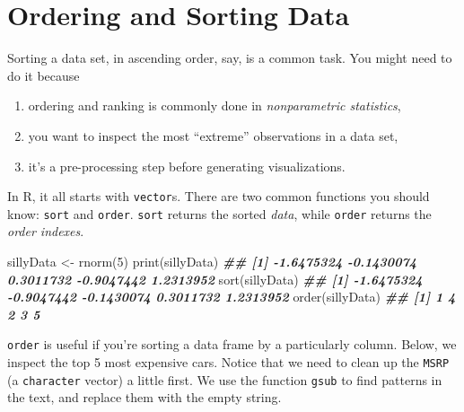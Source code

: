 \documentclass[
  12pt,
]{krantz}
\makeatletter
\newenvironment{Shaded}{\begin{snugshade}}{\end{snugshade}}
\newcommand{\DecValTok}[1]{\textcolor[rgb]{0.06,0.06,0.06}{#1}}
\newcommand{\DocumentationTok}[1]{\textcolor[rgb]{0.37,0.37,0.37}{\textbf{\textit{#1}}}}
\newcommand{\FunctionTok}[1]{\textcolor[rgb]{0,0,0}{#1}}
\newcommand{\NormalTok}[1]{#1}
\newcommand{\OtherTok}[1]{\textcolor[rgb]{0.37,0.37,0.37}{#1}}
\providecommand{\tightlist}{%
  \setlength{\itemsep}{0pt}\setlength{\parskip}{0pt}}
\newenvironment{kframe}{%
\medskip{}
\setlength{\fboxsep}{.8em}
 \def\at@end@of@kframe{}%
 \ifinner\ifhmode%
  \def\at@end@of@kframe{\end{minipage}}%
  \begin{minipage}{\columnwidth}%
 \fi\fi%
 \def\FrameCommand##1{\hskip\@totalleftmargin \hskip-\fboxsep
 \colorbox{shadecolor}{##1}\hskip-\fboxsep
     \hskip-\linewidth \hskip-\@totalleftmargin \hskip\columnwidth}%
 \MakeFramed {\advance\hsize-\width
   \@totalleftmargin\z@ \linewidth\hsize
   \@setminipage}}%
 {\par\unskip\endMakeFramed%
 \at@end@of@kframe}
\renewenvironment{Shaded}{\begin{kframe}}{\end{kframe}}
\makeatother
\begin{document}
\hypertarget{ordering-and-sorting-data}{%
\section{Ordering and Sorting Data}\label{ordering-and-sorting-data}}

Sorting a data set, in ascending order, say, is a common task. You might need to do it because

\begin{enumerate}
\def\labelenumi{\arabic{enumi}.}
\tightlist
\item
  ordering and ranking is commonly done in \emph{nonparametric statistics},
\item
  you want to inspect the most ``extreme'' observations in a data set,
\item
  it's a pre-processing step before generating visualizations.
\end{enumerate}

In R, it all starts with \texttt{vector}s. There are two common functions you should know: \texttt{sort} and \texttt{order}. \texttt{sort} returns the sorted \emph{data}, while \texttt{order} returns the \emph{order indexes}.

\begin{Shaded}
\begin{Highlighting}[]
\NormalTok{sillyData }\OtherTok{\textless{}{-}} \FunctionTok{rnorm}\NormalTok{(}\DecValTok{5}\NormalTok{)}
\FunctionTok{print}\NormalTok{(sillyData)}
\DocumentationTok{\#\# [1] {-}1.6475324 {-}0.1430074  0.3011732 {-}0.9047442  1.2313952}
\FunctionTok{sort}\NormalTok{(sillyData)}
\DocumentationTok{\#\# [1] {-}1.6475324 {-}0.9047442 {-}0.1430074  0.3011732  1.2313952}
\FunctionTok{order}\NormalTok{(sillyData)}
\DocumentationTok{\#\# [1] 1 4 2 3 5}
\end{Highlighting}
\end{Shaded}

\texttt{order} is useful if you're sorting a data frame by a particularly column. Below, we inspect the top 5 most expensive cars. Notice that we need to clean up the \texttt{MSRP} (a \texttt{character} vector) a little first. We use the function \texttt{gsub} to find patterns in the text, and replace them with the empty string.
\end{document}
